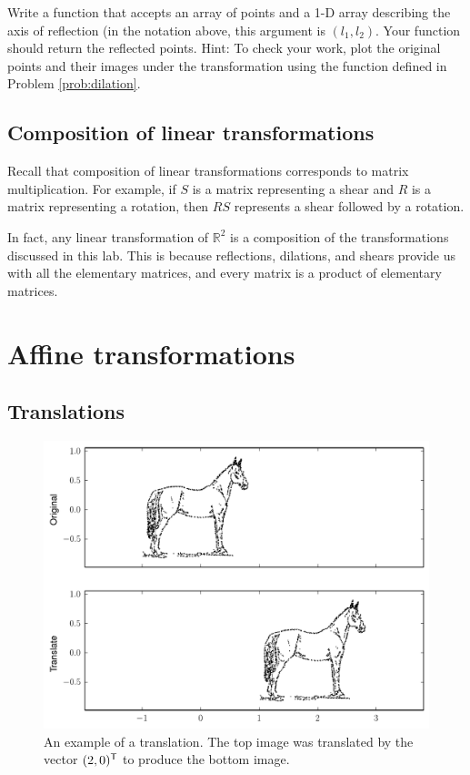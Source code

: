 \begin{problem}[Optional]
Write a function that accepts an array of points and a 1-D array describing the axis of reflection (in the notation above, this argument is $(l_1, l_2)$. 
Your function should return the reflected points. 
Hint: To check your work, plot the original points and their images under the transformation using the function  defined in Problem \ref{prob:dilation}.
\end{problem}

\subsection*{Composition of linear transformations}
Recall that composition of linear transformations corresponds to matrix multiplication. 
For example, if $S$ is a matrix representing a shear and $R$ is a matrix representing a rotation, then $RS$ represents a shear followed by a rotation.

In fact, any linear transformation of $\mathbb{R}^2$ is a composition of the transformations discussed in this lab. 
This is because reflections, dilations, and shears provide us with all the elementary matrices, and every matrix is a product of elementary matrices. 

\section*{Affine transformations}
\subsection*{Translations}

\begin{figure}
\includegraphics[width=\textwidth]{translate.pdf}
\caption{
An example of a translation.
The top image was translated by the vector $(2, 0)^{\mathsf T}$ to produce the bottom image.}
\label{fig:translation}
\end{figure}

